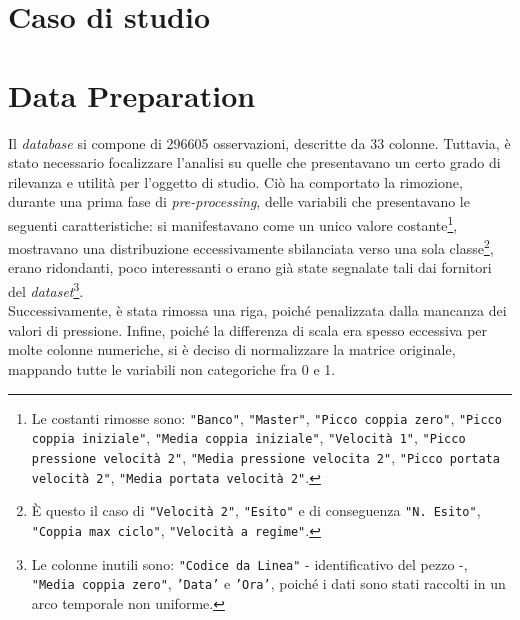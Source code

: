 \documentclass[fleqn,10pt]{SelfArx} %
\affiliation{\textsuperscript{1}\textit{794126, Dipartimento di Informatica, Sistemistica e Comunicazione}} %
\affiliation{\textsuperscript{2}\textit{793516, Dipartimento di Informatica, Sistemistica e Comunicazione}} %
\affiliation{\textsuperscript{3}\textit{?, Dipartimento di Informatica, Sistemistica e Comunicazione}}
\begin{document}
\flushbottom %

\maketitle %

\tableofcontents %

\thispagestyle{empty} %


\section*{Caso di studio} %



\section{Data Preparation}
Il \textit{database} si compone di 296605 osservazioni, descritte da 33 colonne. Tuttavia, è stato necessario focalizzare l'analisi su quelle che presentavano un certo grado di rilevanza e utilità per l'oggetto di studio. Ciò ha comportato la rimozione, durante una prima fase di \textit{pre-processing}, delle variabili che presentavano le seguenti caratteristiche: si manifestavano come un unico valore costante\footnote{Le costanti rimosse sono: \texttt{"Banco"}, \texttt{"Master"}, \texttt{"Picco coppia zero"}, \texttt{"Picco coppia iniziale"}, \texttt{"Media coppia iniziale"}, \texttt{"Velocità 1"}, \texttt{"Picco pressione velocità 2"}, \texttt{"Media pressione velocita 2"}, \texttt{"Picco portata velocità 2"}, \texttt{"Media portata velocità 2"}.}, mostravano una distribuzione eccessivamente sbilanciata verso una sola classe\footnote{È questo il caso di \texttt{"Velocità 2"}, \texttt{"Esito"} e di conseguenza \texttt{"N. Esito"}, \texttt{"Coppia max ciclo"}, \texttt{"Velocità a regime"}.}, erano ridondanti, poco interessanti o erano già state segnalate tali dai fornitori del \textit{dataset}\footnote{Le colonne inutili sono: \texttt{"Codice da Linea"} - identificativo del pezzo -, \texttt{"Media coppia zero"}, \texttt{'Data'} e \texttt{'Ora'}, poiché i dati sono stati raccolti in un arco temporale non uniforme.}.\\
Successivamente, è stata rimossa una riga, poiché penalizzata dalla mancanza dei valori di pressione. Infine, poiché la differenza di scala era spesso eccessiva per molte colonne numeriche, si è deciso di normalizzare la matrice originale, mappando tutte le variabili non categoriche fra 0 e 1. 
\end{document}
